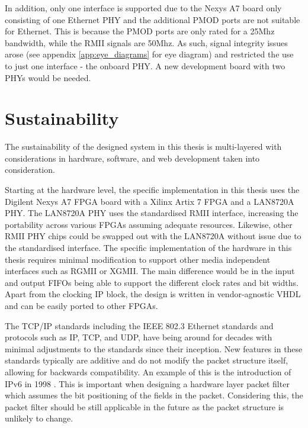 In addition, only one interface is supported due to the Nexys A7 board only consisting of one Ethernet PHY and the additional PMOD ports are not suitable for Ethernet. This is because the PMOD ports are only rated for a 25Mhz bandwidth, while the RMII signals are 50Mhz. As such, signal integrity issues arose (see appendix \ref{app:eye_diagrams} for eye diagram) and restricted the use to just one interface - the onboard PHY. A new development board with two PHYs would be needed.











\section{Sustainability}



The sustainability of the designed system in this thesis is multi-layered with considerations in hardware, software, and web development taken into consideration. 

Starting at the hardware level, the specific implementation in this thesis uses the Digilent Nexys A7 FPGA board with a Xilinx Artix 7 FPGA and a LAN8720A PHY. The LAN8720A PHY uses the standardised RMII interface, increasing the portability across various FPGAs assuming adequate resources. Likewise, other RMII PHY chips could be swapped out with the LAN8720A without issue due to the standardised interface. The specific implementation of the hardware in this thesis requires minimal modification to support other media independent interfaces such as RGMII or XGMII. The main difference would be in the input and output FIFOs being able to support the different clock rates and bit widths. Apart from the clocking IP block, the design is written in vendor-agnostic VHDL and can be easily ported to other FPGAs. 

The TCP/IP standards including the IEEE 802.3 Ethernet standards and protocols such as IP, TCP, and UDP, have being around for decades with minimal adjustments to the standards since their inception. New features in these standards typically are additive and do not modify the packet structure itself, allowing for backwards compatibility. An example of this is the introduction of IPv6 in 1998 \cite{rfc2460}. This is important when designing a hardware layer packet filter which assumes the bit positioning of the fields in the packet. Considering this, the packet filter should be still applicable in the future as the packet structure is unlikely to change.


